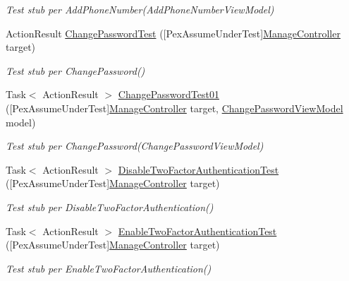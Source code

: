 \begin{DoxyCompactItemize}
\begin{DoxyCompactList}\small\item\em Test stub per Add\+Phone\+Number(\+Add\+Phone\+Number\+View\+Model)\end{DoxyCompactList}\item 
Action\+Result \mbox{\hyperlink{class_brew_day2_1_1_tests_1_1_manage_controller_test_a081a246b5a24c46939096be6a69abb84}{Change\+Password\+Test}} (\mbox{[}Pex\+Assume\+Under\+Test\mbox{]}\mbox{\hyperlink{class_brew_day2_1_1_controllers_1_1_manage_controller}{Manage\+Controller}} target)
\begin{DoxyCompactList}\small\item\em Test stub per Change\+Password()\end{DoxyCompactList}\item 
Task$<$ Action\+Result $>$ \mbox{\hyperlink{class_brew_day2_1_1_tests_1_1_manage_controller_test_a47719f7944b331f85d868a248c197a86}{Change\+Password\+Test01}} (\mbox{[}Pex\+Assume\+Under\+Test\mbox{]}\mbox{\hyperlink{class_brew_day2_1_1_controllers_1_1_manage_controller}{Manage\+Controller}} target, \mbox{\hyperlink{class_brew_day2_1_1_models_1_1_change_password_view_model}{Change\+Password\+View\+Model}} model)
\begin{DoxyCompactList}\small\item\em Test stub per Change\+Password(\+Change\+Password\+View\+Model)\end{DoxyCompactList}\item 
Task$<$ Action\+Result $>$ \mbox{\hyperlink{class_brew_day2_1_1_tests_1_1_manage_controller_test_ae8e5b73a0e2bb5dd6dc1a70054ba996c}{Disable\+Two\+Factor\+Authentication\+Test}} (\mbox{[}Pex\+Assume\+Under\+Test\mbox{]}\mbox{\hyperlink{class_brew_day2_1_1_controllers_1_1_manage_controller}{Manage\+Controller}} target)
\begin{DoxyCompactList}\small\item\em Test stub per Disable\+Two\+Factor\+Authentication()\end{DoxyCompactList}\item 
Task$<$ Action\+Result $>$ \mbox{\hyperlink{class_brew_day2_1_1_tests_1_1_manage_controller_test_a3db4eb01911e39ecc57aa38f7b802b4a}{Enable\+Two\+Factor\+Authentication\+Test}} (\mbox{[}Pex\+Assume\+Under\+Test\mbox{]}\mbox{\hyperlink{class_brew_day2_1_1_controllers_1_1_manage_controller}{Manage\+Controller}} target)
\begin{DoxyCompactList}\small\item\em Test stub per Enable\+Two\+Factor\+Authentication()\end{DoxyCompactList}\item 

\end{DoxyCompactItemize}
